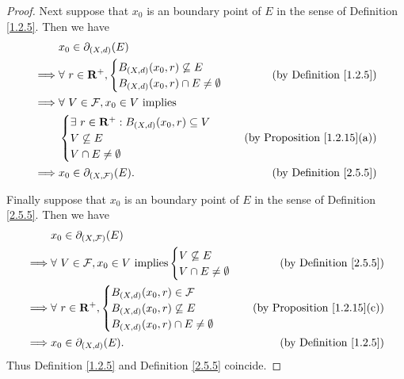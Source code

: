 \begin{proof}
    Next suppose that \(x_0\) is an boundary point of \(E\) in the sense of Definition \ref{1.2.5}.
    Then we have
    \begin{align*}
                 & x_0 \in \partial_{(X, d)}(E)                                                                      \\
        \implies & \forall\ r \in \mathbf{R}^+, \begin{cases}
            B_{(X, d)}(x_0, r) \not\subseteq E \\
            B_{(X, d)}(x_0, r) \cap E \neq \emptyset
        \end{cases} & \text{(by Definition \ref{1.2.5})}      \\
        \implies & \forall\ V \in \mathcal{F}, x_0 \in V \text{ implies}                                             \\
                 & \begin{cases}
            \exists\ r \in \mathbf{R}^+ : B_{(X, d)}(x_0, r) \subseteq V \\
            V \not\subseteq E                                            \\
            V \cap E \neq \emptyset
        \end{cases}                              & \text{(by Proposition \ref{1.2.15}(a))} \\
        \implies & x_0 \in \partial_{(X, \mathcal{F})}(E).                 & \text{(by Definition \ref{2.5.5})}
    \end{align*}

    Finally suppose that \(x_0\) is an boundary point of \(E\) in the sense of Definition \ref{2.5.5}.
    Then we have
    \begin{align*}
                 & x_0 \in \partial_{(X, \mathcal{F})}(E)                                                                                     \\
        \implies & \forall\ V \in \mathcal{F}, x_0 \in V \text{ implies} \begin{cases}
            V \not\subseteq E \\
            V \cap E \neq \emptyset
        \end{cases} & \text{(by Definition \ref{2.5.5})}      \\
        \implies & \forall\ r \in \mathbf{R}^+, \begin{cases}
            B_{(X, d)}(x_0, r) \in \mathcal{F} \\
            B_{(X, d)}(x_0, r) \not\subseteq E \\
            B_{(X, d)}(x_0, r) \cap E \neq \emptyset
        \end{cases}                          & \text{(by Proposition \ref{1.2.15}(c))} \\
        \implies & x_0 \in \partial_{(X, d)}(E).                                                    & \text{(by Definition \ref{1.2.5})}
    \end{align*}
    Thus Definition \ref{1.2.5} and Definition \ref{2.5.5} coincide.
\end{proof}

